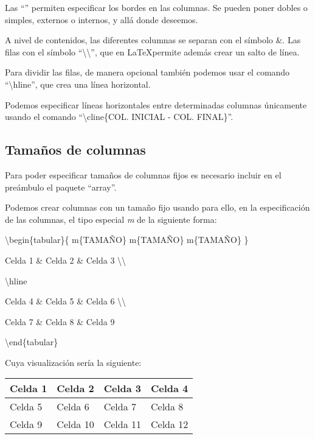 Las ``\vline'' permiten especificar los bordes en las columnas. Se pueden poner dobles o simples, externos o internos, y allá donde deseemos.

A nivel de contenidos, las diferentes columnas se separan con el símbolo \&. Las filas con el símbolo ``\textbackslash\textbackslash'', que en \LaTeX permite además crear un salto de línea.

Para dividir las filas, de manera opcional también podemos usar el comando ``\textbackslash hline'', que crea una línea horizontal.

Podemos especificar líneas horizontales entre determinadas columnas únicamente usando el comando ``\textbackslash cline\{COL. INICIAL - COL. FINAL\}''.

\subsection{Tamaños de columnas}

Para poder especificar tamaños de columnas fijos es necesario incluir en el preámbulo el paquete ``array''.

Podemos crear columnas con un tamaño fijo usando para ello, en la especificación de las columnas, el tipo especial \emph{m} de la siguiente forma:

\textbackslash begin\{tabular\}\{ m\{TAMAÑO\} \vline m\{TAMAÑO\} \vline m\{TAMAÑO\} \}

 Celda 1 \& Celda 2 \& Celda 3 \textbackslash\textbackslash
 
 \textbackslash hline
 
 Celda 4 \& Celda 5 \& Celda 6 \textbackslash\textbackslash
 
 Celda 7 \& Celda 8 \& Celda 9
  
\textbackslash end\{tabular\}

Cuya visualización sería la siguiente: %

\begin{tabular}{ m{2.5cm}|m{25mm}|m{40pt}|m{} }
 Celda 1 & Celda 2 & Celda 3 & Celda 4 \\
 \hline
 Celda 5 & Celda 6 & Celda 7 & Celda 8 \\  
 Celda 9 & Celda 10 & Celda 11 & Celda 12   
\end{tabular}

